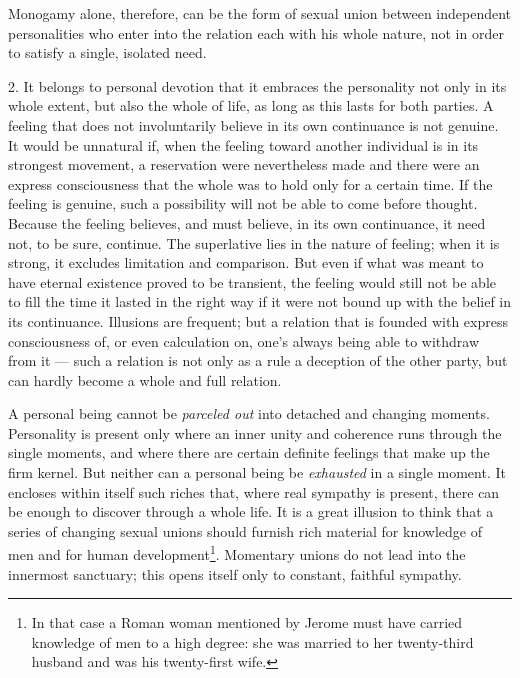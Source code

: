 \documentclass[12pt,a4paper,openany]{book}
\newcommand{\opage}[1]{\marginnote{\footnotesize\textit{[#1]}}}
\begin{document}
Monogamy alone, therefore, can be the form of sexual union between independent personalities who enter into the
\opage{288}relation each with his whole nature, not in order to satisfy a single, isolated need.

2. It belongs to personal devotion that it embraces the personality not only in its whole extent, but also the whole of
life, as long as this lasts for both parties. A feeling that does not involuntarily believe in its own continuance is
not genuine. It would be unnatural if, when the feeling toward another individual is in its strongest movement, a
reservation were nevertheless made and there were an express consciousness that the whole was to hold only for a
certain time. If the feeling is genuine, such a possibility will not be able to come before thought. Because the
feeling believes, and must believe, in its own continuance, it need not, to be sure, continue. The superlative lies in
the nature of feeling; when it is strong, it excludes limitation and comparison. But even if what was meant to have
eternal existence proved to be transient, the feeling would still not be able to fill the time it lasted in the right
way if it were not bound up with the belief in its continuance. Illusions are frequent; but a relation that is founded
with express consciousness of, or even calculation on, one's always being able to withdraw from it --- such a relation
is not only as a rule a deception of the other party, but can hardly become a whole and full relation.

A personal being cannot be \textit{parceled out} into detached and changing moments. Personality is present only where an
inner unity and coherence runs through the single moments, and where there are certain definite feelings that make up
the firm kernel. But neither can a personal being be \textit{exhausted} in a single moment. It encloses within itself
such riches that, where real sympathy is present, there can be enough to discover through a whole life. It is a great
illusion to think that a series of changing sexual unions should furnish rich material for knowledge of men and for
human development\footnote[1]{In that case a Roman woman mentioned by Jerome must have carried knowledge of men to a high
degree: she was married to her twenty-third husband and was his twenty-first wife.}.
\opage{289}Momentary unions do not lead into the innermost sanctuary; this opens itself only to constant, faithful
sympathy.
\end{document}
